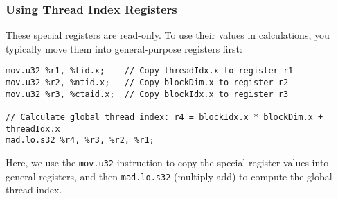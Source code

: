 \subsubsection{Using Thread Index Registers}

These special registers are read-only. To use their values in calculations, you typically move them into general-purpose registers first:

\begin{lstlisting}[style=ptx]
mov.u32 %r1, %tid.x;    // Copy threadIdx.x to register r1
mov.u32 %r2, %ntid.x;   // Copy blockDim.x to register r2
mov.u32 %r3, %ctaid.x;  // Copy blockIdx.x to register r3

// Calculate global thread index: r4 = blockIdx.x * blockDim.x + threadIdx.x
mad.lo.s32 %r4, %r3, %r2, %r1;
\end{lstlisting}

Here, we use the \texttt{mov.u32} instruction to copy the special register values into general registers, and then \texttt{mad.lo.s32} (multiply-add) to compute the global thread index.

